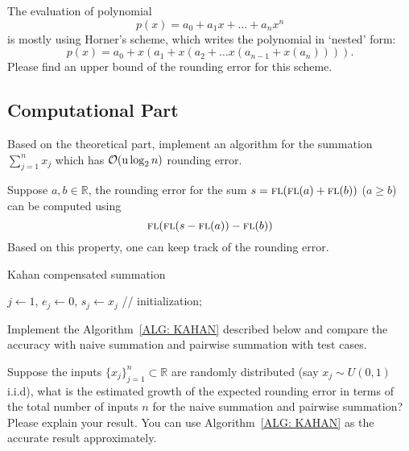 \begin{problem}
\label{Prb: 1-Theo-3}
The evaluation of polynomial 
    $$p(x) = a_0 + a_1 x + \dots + a_n x^n$$
is mostly using Horner's scheme, which writes the polynomial in `nested' form:
\begin{equation}
p(x) = a_0 + x (a_1 + x(a_2 + \dots x(a_{n-1} + x(a_n)))).
\end{equation}                                
Please find an upper bound of the rounding error for this scheme.         
\end{problem}

\subsection{Computational Part}

\begin{problem}
    Based on the theoretical part, implement an algorithm for the summation $\sum_{j=1}^n x_j$ which has $\mathcal O(\textup{u}\log_2 n)$ rounding error.
\end{problem}

\begin{problem} 
\label{Prb: 1-Kahan-Sum}
Suppose $a, b\in\mathbb{R}$, the rounding error for the sum $s = {\textsc{fl}}({\textsc{fl}}(a)+{\textsc{fl}}(b))$ ($a\ge b$) can be computed using 
    $${\textsc{fl}}({\textsc{fl}}(s - {\textsc{fl}}(a))-{\textsc{fl}}(b))$$
    Based on this property, one can keep track of the rounding error. 
\begin{algorithm}[!htb]
    \SetAlgoLined
    \caption{Kahan compensated summation}\label{alg:1}
    $j\gets 1$, $e_j \gets 0$, $s_j \gets x_j$ //    initialization; 
    \\
    \label{ALG: KAHAN}
\end{algorithm}
    Implement the Algorithm~\ref{ALG: KAHAN} described below and compare the accuracy with naive summation and pairwise summation with test cases.
\end{problem}


\begin{problem}
    Suppose the inputs $\{x_j\}_{j=1}^n\subset \mathbb{R}$ are randomly distributed (say $x_j\sim U(0,1)$ i.i.d), what is the estimated growth of the expected rounding error in terms of the total number of inputs $n$ for the naive summation and pairwise summation? Please explain your result. You can use Algorithm~\ref{ALG: KAHAN} as the accurate result approximately. 
\end{problem}
\newpage
\nocite{higham1993accuracy,higham2019new,muller2006elementary}


